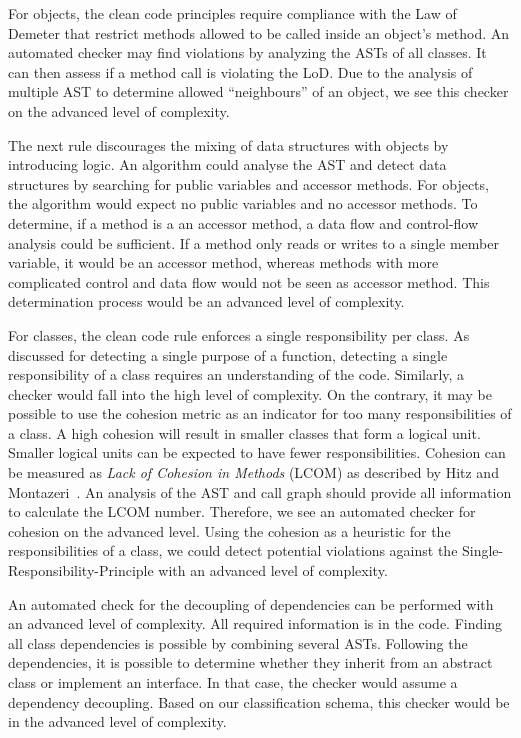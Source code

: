 For objects, the clean code principles require compliance with the Law of Demeter that restrict methods allowed to be called inside an object's method. An automated checker may find violations by analyzing the ASTs of all classes. It can then assess if a method call is violating the LoD. Due to the analysis of multiple AST to determine allowed \enquote{neighbours} of an object, we see this checker on the advanced level of complexity.

The next rule discourages the mixing of data structures with objects by introducing logic. An algorithm could analyse the AST and detect data structures by searching for public variables and accessor methods. For objects, the algorithm would expect no public variables and no accessor methods. To determine, if a method is a an accessor method, a data flow and control-flow analysis could be sufficient. If a method only reads or writes to a single member variable, it would be an accessor method, whereas methods with more complicated control and data flow would not be seen as accessor method. This determination process would be an advanced level of complexity.

For classes, the clean code rule enforces a single responsibility per class. As discussed for detecting a single purpose of a function, detecting a single responsibility of a class requires an understanding of the code. Similarly, a checker would fall into the high level of complexity. On the contrary, it may be possible to use the cohesion metric as an indicator for too many responsibilities of a class. A high cohesion will result in smaller classes that form a logical unit. Smaller logical units can be expected to have fewer responsibilities. Cohesion can be measured as \textit{Lack of Cohesion in Methods} (LCOM) as described by Hitz and Montazeri~\cite{Hitz95measuringcoupling}. An analysis of the AST and call graph should provide all information to calculate the LCOM number. Therefore, we see an automated checker for cohesion on the advanced level. Using the cohesion as a heuristic for the responsibilities of a class, we could detect potential violations against the Single-Responsibility-Principle with an advanced level of complexity.

An automated check for the decoupling of dependencies can be performed with an advanced level of complexity. All required information is in the code. Finding all class dependencies is possible by combining several ASTs. Following the dependencies, it is possible to determine whether they inherit from an abstract class or implement an interface. In that case, the checker would assume a dependency decoupling. Based on our classification schema, this checker would be in the advanced level of complexity.

